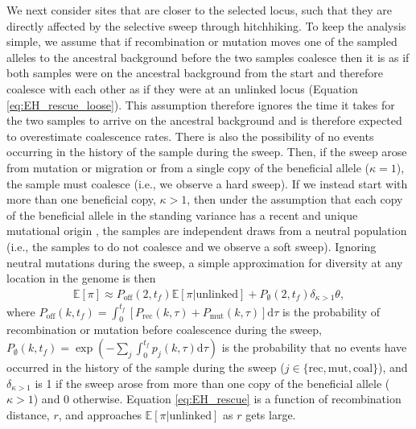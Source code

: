 \documentclass[]{article}
\begin{document}
We next consider sites that are closer to the selected locus, such that they are directly affected by the selective sweep through hitchhiking.
To keep the analysis simple, we assume that if recombination or mutation moves one of the sampled alleles to the ancestral background before the two samples coalesce then it is as if both samples were on the ancestral background from the start and therefore coalesce with each other as if they were at an unlinked locus (Equation \ref{eq:EH_rescue_loose}).
This assumption therefore ignores the time it takes for the two samples to arrive on the ancestral background and is therefore expected to overestimate coalescence rates.
There is also the possibility of no events occurring in the history of the sample during the sweep.
Then, if the sweep arose from mutation or migration or from a single copy of the beneficial allele ($\kappa=1$), the sample must coalesce (i.e., we observe a hard sweep). 
If we instead start with more than one beneficial copy, $\kappa>1$, then under the assumption that each copy of the beneficial allele in the standing variance has a recent and unique mutational origin \citep[which we will assume throughout for simplicity, noting this effectively implies the beneficial allele was sufficiently deleterious before the environmental change; c.f.,][]{prezeworski2005signature}, the samples are independent draws from a neutral population (i.e., the samples to do not coalesce and we observe a soft sweep).
Ignoring neutral mutations during the sweep, a simple approximation for diversity at any location in the genome is then
\begin{equation}\label{eq:EH_rescue}
\begin{aligned}
\mathbb{E}[\pi ] \approx P_\mathrm{off}(2,t_f) \mathbb{E}[\pi | \mathrm{unlinked}] + P_\emptyset(2,t_f) \delta_{\kappa>1} \theta,
\end{aligned}
\end{equation}
where $P_\mathrm{off}(k,t_f) = \int_0^{t_f} [P_\mathrm{rec}(k,\tau) + P_\mathrm{mut}(k,\tau)] \mathrm{d}\tau$ is the probability of recombination or mutation before coalescence during the sweep, $P_\emptyset(k, t_f) = \exp \left( -\sum_{j} \int_{0}^{t_f} p_{j}(k,\tau) \mathrm{d}\tau \right)$ is the probability that no events have occurred in the history of the sample during the sweep ($j\in\{\mathrm{rec},\mathrm{mut},\mathrm{coal}\}$), and $\delta_{\kappa>1}$ is 1 if the sweep arose from more than one copy of the beneficial allele ($\kappa>1$) and 0 otherwise.
Equation \ref{eq:EH_rescue} is a function of recombination distance, $r$, and approaches $\mathbb{E}[\pi | \mathrm{unlinked}]$ as $r$ gets large.
\end{document}

